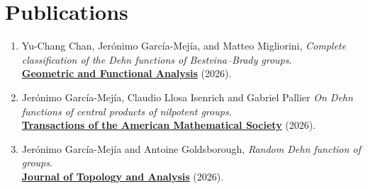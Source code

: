 \documentclass[a4paper,10pt]{article} %
\begin{document}

\section{Publications}

\begin{enumerate}[align=right, itemsep=.5em, leftmargin=1.8em]

	\item Yu-Chang Chan, Jerónimo García-Mejía, and Matteo Migliorini, \emph{Complete classification of the Dehn functions of Bestvina--Brady groups}. \\ {\href{https://doi.org/10.1007/s00039-026-00731-7}{\textbf{Geometric and Functional Analysis}}} (2026).%

	\item Jerónimo García-Mejía, Claudio Llosa Isenrich and Gabriel Pallier \emph{On Dehn functions of central products of nilpotent groups}.\\ 
	{\href{https://doi.org/10.1090/tran/9708}{\textbf{Transactions of the American Mathematical Society}}} (2026). %
	
	\item Jerónimo García-Mejía and Antoine Goldsborough, \emph{Random Dehn function of groups}. \\
	{\href{https://doi.org/10.1142/S179352532550027X}{\textbf{Journal of Topology and Analysis}}} (2026). %
    
\end{enumerate}

%
%	
%    
\end{document}
